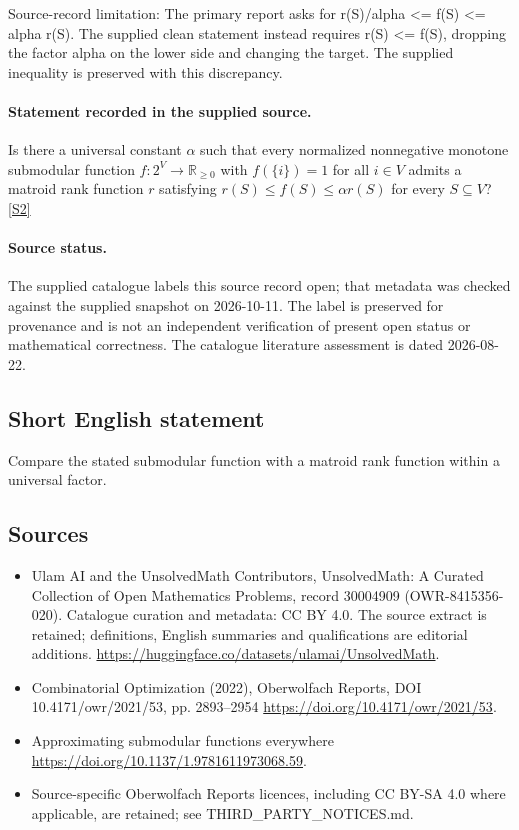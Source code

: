 \documentclass[11pt]{article}
\begin{document}
Source-record limitation: The primary report asks for r(S)/alpha <= f(S) <= alpha r(S). The supplied clean statement instead requires r(S) <= f(S), dropping the factor alpha on the lower side and changing the target. The supplied inequality is preserved with this discrepancy.
\paragraph{Statement recorded in the supplied source.}
Is there a universal constant $\alpha$ such that every normalized nonnegative monotone submodular function $f:2^V\to\mathbb R_{\geq0}$ with $f(\{i\})=1$ for all $i\in V$ admits a matroid rank function $r$ satisfying $r(S)\leq f(S)\leq\alpha r(S)$ for every $S\subseteq V$? \href{https://doi.org/10.4171/owr/2021/53}{[S2]}
\paragraph{Source status.}
The supplied catalogue labels this source record open; that metadata was checked against the supplied snapshot on 2026-10-11. The label is preserved for provenance and is not an independent verification of present open status or mathematical correctness. The catalogue literature assessment is dated 2026-08-22.
\subsection{Short English statement}
Compare the stated submodular function with a matroid rank function within a universal factor.
\subsection{Sources}
\begin{itemize}
\item[S1] Ulam AI and the UnsolvedMath Contributors, UnsolvedMath: A Curated Collection of Open Mathematics Problems, record 30004909 (OWR-8415356-020). Catalogue curation and metadata: CC BY 4.0. The source extract is retained; definitions, English summaries and qualifications are editorial additions.
\url{https://huggingface.co/datasets/ulamai/UnsolvedMath}.
\item[S2] Combinatorial Optimization (2022), Oberwolfach Reports, DOI 10.4171/owr/2021/53, pp. 2893--2954
\url{https://doi.org/10.4171/owr/2021/53}.
\item[S3] Approximating submodular functions everywhere
\url{https://doi.org/10.1137/1.9781611973068.59}.
\item Source-specific Oberwolfach Reports licences, including CC BY-SA 4.0 where applicable, are retained; see THIRD\_PARTY\_NOTICES.md.
\end{itemize}
\end{document}
